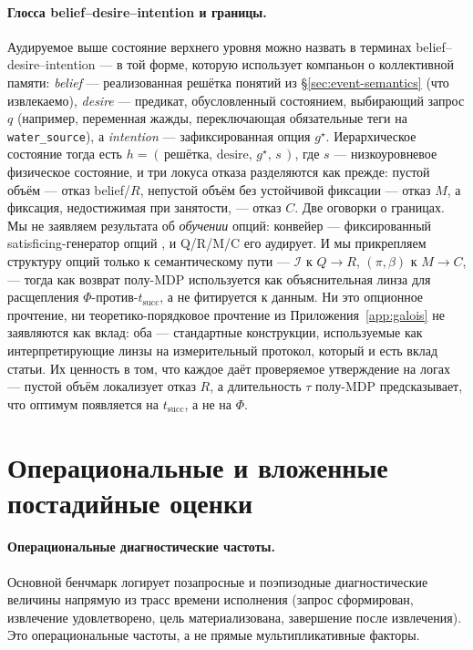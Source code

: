 \documentclass{article}
\newcommand{\method}[1]{\texttt{#1}}
\begin{document}
\paragraph{Глосса belief--desire--intention и границы.}
Аудируемое выше состояние верхнего уровня можно назвать в
терминах belief--desire--intention --- в той форме, которую использует
компаньон о коллективной памяти: \emph{belief} --- реализованная решётка
понятий из \S\ref{sec:event-semantics} (что извлекаемо), \emph{desire} ---
предикат, обусловленный состоянием, выбирающий запрос $q$ (например,
переменная жажды, переключающая обязательные теги на \method{water\_source}),
а \emph{intention} --- зафиксированная опция $g^\star$. Иерархическое
состояние тогда есть $h=(\,\text{решётка},\,\text{desire},\,g^\star,\,s\,)$, где
$s$ --- низкоуровневое физическое состояние, и три локуса отказа разделяются как
прежде: пустой объём --- отказ belief/$R$, непустой объём
без устойчивой фиксации --- отказ $M$, а фиксация, недостижимая при
занятости, --- отказ $C$. Две оговорки о границах. Мы не заявляем результата
об \emph{обучении} опций: конвейер --- фиксированный satisficing-генератор опций
\citep{simon1955behavioral}, и Q/R/M/C его аудирует. И мы прикрепляем
структуру опций только к семантическому пути --- $\mathcal{I}$ к
$Q\!\rightarrow\!R$, $(\pi,\beta)$ к $M\!\rightarrow\!C$, --- тогда как
возврат полу-MDP используется как объяснительная линза для расщепления
$\Phi$-против-$t_{\mathrm{succ}}$, а не фитируется к данным. Ни
это опционное прочтение, ни теоретико-порядковое прочтение из
Приложения~\ref{app:galois} не заявляются как вклад: оба --- стандартные
конструкции, используемые как интерпретирующие линзы на измерительный протокол,
который и есть вклад статьи. Их ценность в том, что каждое даёт
проверяемое утверждение на логах --- пустой объём локализует отказ $R$,
а длительность $\tau$ полу-MDP предсказывает, что оптимум
появляется на $t_{\mathrm{succ}}$, а не на $\Phi$.

\section{Операциональные и вложенные постадийные оценки}
\label{app:estimators}

\paragraph{Операциональные диагностические частоты.}
Основной бенчмарк логирует позапросные и поэпизодные диагностические величины напрямую из трасс времени исполнения (запрос сформирован, извлечение удовлетворено, цель материализована, завершение после извлечения). Это операциональные частоты, а не прямые мультипликативные факторы.
\end{document}
